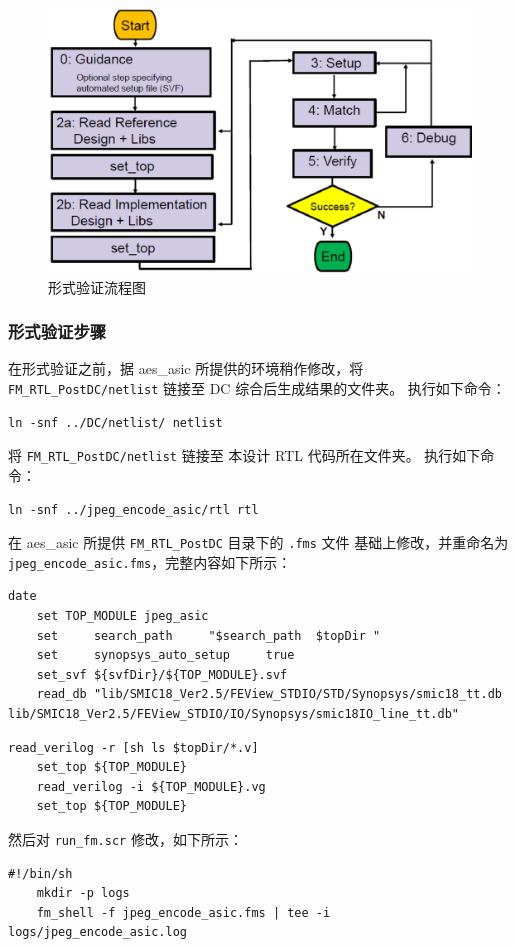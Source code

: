 \documentclass[12pt,hyperref,a4paper,UTF8]{ctexart}
\begin{document}
\begin{figure}[htbp]
    \centering
    \includegraphics[width =.45\textwidth]{figures/fm_flow.png}
    \caption{形式验证流程图}
    \label{fm_flow}
\end{figure}

\subsubsection{形式验证步骤}
在形式验证之前，据 aes\_asic 所提供的环境稍作修改，将 \texttt{FM\_RTL\_PostDC/netlist}
链接至 DC 综合后生成结果的文件夹。 执行如下命令：
\begin{lstlisting}[style=bashstyle]
    ln -snf ../DC/netlist/ netlist
\end{lstlisting}

将 \texttt{FM\_RTL\_PostDC/netlist} 链接至 本设计 RTL 代码所在文件夹。 
执行如下命令：
\begin{lstlisting}[style=bashstyle]
    ln -snf ../jpeg_encode_asic/rtl rtl
\end{lstlisting}

在 aes\_asic 所提供 \texttt{FM\_RTL\_PostDC} 目录下的 \texttt{.fms} 文件
基础上修改，并重命名为 \texttt{jpeg\_encode\_asic.fms}，完整内容如下所示：
\begin{lstlisting}[style=tclstyle,name=jpeg_encode_asic.fms]
    date
    set TOP_MODULE jpeg_asic
    set     search_path     "$search_path  $topDir "
    set     synopsys_auto_setup     true
    set_svf ${svfDir}/${TOP_MODULE}.svf
    read_db "lib/SMIC18_Ver2.5/FEView_STDIO/STD/Synopsys/smic18_tt.db lib/SMIC18_Ver2.5/FEView_STDIO/IO/Synopsys/smic18IO_line_tt.db"
\end{lstlisting}
\begin{lstlisting}[style=tclstyle,name=jpeg_encode_asic.fms]
    read_verilog -r [sh ls $topDir/*.v]
    set_top ${TOP_MODULE}
    read_verilog -i ${TOP_MODULE}.vg
    set_top ${TOP_MODULE}
\end{lstlisting}

然后对 \texttt{run\_fm.scr} 修改，如下所示：

\begin{lstlisting}[style=bashstyle,name=run_fm.scr]
    #!/bin/sh
    mkdir -p logs
    fm_shell -f jpeg_encode_asic.fms | tee -i logs/jpeg_encode_asic.log
\end{lstlisting}
\end{document}
